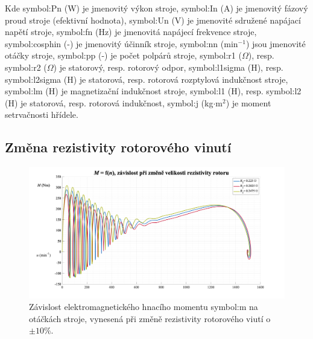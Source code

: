 \documentclass[a4paper, twoside, 11pt]{article}
\newcommand{\fbar}{\FloatBarrier}
\begin{document}
        \vspace*{1cm}
Kde \gls{symbol:Pn} (W) je jmenovitý výkon stroje, \gls{symbol:In} (A) je jmenovitý fázový proud stroje (efektivní hodnota), \gls{symbol:Un} (V) je jmenovité sdružené napájací napětí stroje, \gls{symbol:fn} (Hz) je jmenovitá napájecí frekvence stroje, \gls{symbol:cosphin} (-) je jmenovitý účinník stroje, \gls{symbol:nn} (min$^{-1}$) jsou jmenovité otáčky stroje, \gls{symbol:pp} (-) je počet polpárů stroje, \gls{symbol:r1} ($\Omega$), resp. \gls{symbol:r2} ($\Omega$) je statorový, resp. rotorový odpor, \gls{symbol:l1sigma} (H), resp. \gls{symbol:l2sigma} (H) je statorová, resp. rotorová rozptylová  indukčnost stroje, \gls{symbol:lm} (H) je magnetizační indukčnost stroje, \gls{symbol:l1} (H), resp. \gls{symbol:l2} (H) je statorová, resp. rotorová indukčnost, \gls{symbol:j} (kg$\cdot$m$^{2}$) je moment setrvačnosti hřídele.\par

\newpage
    \subsection{Změna rezistivity rotorového vinutí}
        \begin{figure}[htbp!]
            \centering
            \includegraphics[width=1\textwidth]{src/png/mh_dyn_nGraphR2.png}
            \caption{Závislost elektromagnetického hnacího momentu \gls{symbol:m} na otáčkách stroje, vynesená při změně rezistivity rotorového viutí o $\pm 10 \%$.}
            \label{fig:mh_dyn_nGraphR2}
        \end{figure}

    \fbar
\end{document}
